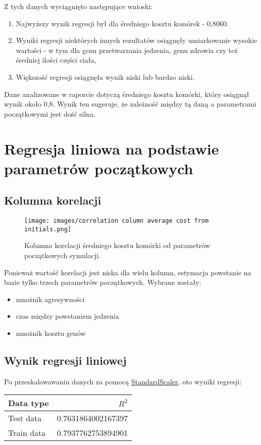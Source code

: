 \documentclass{article}
\begin{document}
Z tych danych wyciągnięto następujące wnioski:
\begin{enumerate}
    \item Najwyższy wynik regresji był dla średniego kosztu komórek - 0,8060.
    \item Wyniki regresji niektórych innych rezultatów osiągnęły umiarkowanie wysokie wartości - w tym dla genu przetwarzania jedzenia, genu zdrowia czy też średniej ilości części ciała, 
    \item Większość regresji osiągnęła wynik niski lub bardzo niski.
\end{enumerate}
Dane analizowane w raporcie dotyczą średniego kosztu komórki, który osiągnął wynik około 0,8. Wynik ten sugeruje, że zależność między tą daną a parametrami początkowymi jest dość silna.

\section{Regresja liniowa na podstawie parametrów początkowych}

\subsection{Kolumna korelacji}
\begin{figure}[H]
    \centering
    \texttt{[image: images/correlation column average cost from initials.png]}
    \caption{Kolumna korelacji średniego kosztu komórki od parametrów początkowych symulacji.}    
\end{figure}

Ponieważ wartość korelacji jest niska dla wielu kolumn, estymacja powstanie na bazie tylko trzech parametrów początkowych. Wybrane zostały:
\begin{itemize}
    \item mnożnik agresywności
    \item czas między powstaniem jedzenia
    \item mnożnik kosztu genów
\end{itemize}
\label{correlation-items1}

\subsection{Wynik regresji liniowej}
\label{regression-from-initial-parameters}
Po przeskalowawaniu danych za pomocą \href{https://scikit-learn.org/stable/modules/generated/sklearn.preprocessing.StandardScaler.html}{StandardScaler}, oto wyniki regresji:
\begin{table}[H]
    \centering
    \begin{tabular}{lr}
        \toprule
        \textbf{Data type} & \textbf{\(R^2\)} \\
        \midrule        
        Test data & 0.7631864002167397 \\
        Train data & 0.7937762753894901 \\ 
        \bottomrule
    \end{tabular}
    \label{tab:genetic_metrics}
\end{table}
\end{document}
